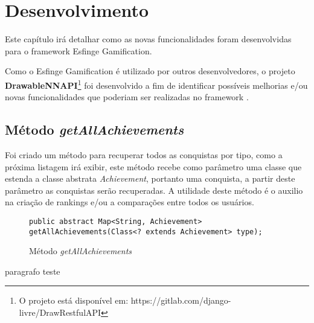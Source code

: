 \newpage
\chapter{Desenvolvimento}
\label{ch:desenvolvimento}

\par Este capítulo irá detalhar como as novas funcionalidades foram desenvolvidas para o framework Esfinge Gamification.

\par Como o Esfinge Gamification é utilizado por outros desenvolvedores, o projeto \textbf{DrawableNNAPI}\footnote{O projeto está disponível em: https://gitlab.com/django-livre/DrawRestfulAPI} foi desenvolvido a fim de identificar possíveis melhorias e/ou novas funcionalidades que poderiam ser realizadas no framework .

\section{Método \textit{getAllAchievements}}
\par Foi criado um método para recuperar todos as conquistas por tipo, como a próxima listagem irá exibir, este método recebe como parâmetro uma classe que estenda a classe abstrata \textit{Achievement}, portanto uma conquista, a partir deste parâmetro as conquistas serão recuperadas. A utilidade deste método é o auxilio na criação de rankings e/ou a comparações entre todos os usuários.

\begin{figure}[H]
    \centering
    \begin{lstlisting}
public abstract Map<String, Achievement> getAllAchievements(Class<? extends Achievement> type);
\end{lstlisting}
    \caption{Método \textit{getAllAchievements}}
    \label{fig:metodo getAllAchievement}
\end{figure}

\par paragrafo teste